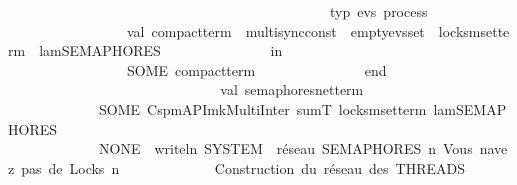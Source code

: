 \begin{isabellebody}
\ \ \ \ \ \ \ \ \ \ \ \ \ \ \ \ \ \ \ \ \ \ \ \ \ \ \ \ \ \ \ \ \ \ \ \ \ \ \ \ \ \ \ \ \ \ {\isacharat}{\kern0pt}{\isacharbraceleft}{\kern0pt}typ\ {\isachardoublequote}{\kern0pt}{\isacharparenleft}{\kern0pt}evs{\isacharparenright}{\kern0pt}\ process{\isachardoublequote}{\kern0pt}{\isacharbraceright}{\kern0pt}{\isacharparenright}{\kern0pt}\isanewline
\ \ \ \ \ \ \ \ \ \ \ \ \ \ \ \ \ val\ compact{\isacharunderscore}{\kern0pt}term\ {\isacharequal}{\kern0pt}\ multisync{\isacharunderscore}{\kern0pt}const\ {\isachardollar}{\kern0pt}\ empty{\isacharunderscore}{\kern0pt}evs{\isacharunderscore}{\kern0pt}set\ {\isachardollar}{\kern0pt}\ locks{\isacharunderscore}{\kern0pt}mset{\isacharunderscore}{\kern0pt}term\ {\isachardollar}{\kern0pt}\ lam{\isacharunderscore}{\kern0pt}SEMAPHORES\isanewline
\ \ \ \ \ \ \ \ \ \ \ \ \ \ \ in\isanewline
\ \ \ \ \ \ \ \ \ \ \ \ \ \ \ \ \ SOME\ compact{\isacharunderscore}{\kern0pt}term\isanewline
\ \ \ \ \ \ \ \ \ \ \ \ \ \ \ end{\isacharparenright}{\kern0pt}\isanewline
\ \ \ \ \ \ \ \ \ \ \ \ \isanewline
\isanewline
\ \ \ \ \ \ \ \ \ \isanewline
\ \ \ \ \ \ \ \ \ \ \isanewline
\ \ \ \ \ \ \ \ \ \ {\isacharparenleft}{\kern0pt}{\isacharasterisk}{\kern0pt}val\ semaphores{\isacharunderscore}{\kern0pt}net{\isacharunderscore}{\kern0pt}term\ {\isacharequal}{\kern0pt}\ \isanewline
\ \ \ \ \ \ \ \ \ \ \ \ \ SOME{\isacharparenleft}{\kern0pt}\ Cspm{\isacharunderscore}{\kern0pt}API{\isachardot}{\kern0pt}mk{\isacharunderscore}{\kern0pt}MultiInter{\isacharunderscore}{\kern0pt}\ sumT\ locks{\isacharunderscore}{\kern0pt}mset{\isacharunderscore}{\kern0pt}term\ lam{\isacharunderscore}{\kern0pt}SEMAPHORES\ {\isacharparenright}{\kern0pt}\ {\isacharasterisk}{\kern0pt}{\isacharparenright}{\kern0pt}\ \ \ \ \ \ \ \ \ \ \isanewline
\isanewline
\ \ \ \ \ \ \ \ \ \ \ \ \ {\isacharparenleft}{\kern0pt}{\isacharasterisk}{\kern0pt}{\isacharbar}{\kern0pt}NONE\ {\isacharequal}{\kern0pt}{\isachargreater}{\kern0pt}\ writeln\ {\isacharparenleft}{\kern0pt}{\isachardoublequote}{\kern0pt}{\isacharbrackleft}{\kern0pt}SYSTEM{\isacharbrackright}{\kern0pt}\ \ réseau\ SEMAPHORES\ {\isacharcolon}{\kern0pt}{\isacharbackslash}{\kern0pt}n\ Vous\ n{\isacharprime}{\kern0pt}avez\ pas\ de\ Locks\ {\isacharbackslash}{\kern0pt}n{\isachardoublequote}{\kern0pt}{\isacharparenright}{\kern0pt}\ {\isacharasterisk}{\kern0pt}{\isacharparenright}{\kern0pt}\isanewline
\isanewline
\ \ \ \ \ \ \ \ \ \ {\isacharparenleft}{\kern0pt}{\isacharasterisk}{\kern0pt}\ {}{\isachardot}{\kern0pt}\ Construction\ du\ réseau\ des\ THREADS\ {\isacharminus}{\kern0pt}{\isacharminus}{\kern0pt}{\isacharminus}{\kern0pt}{\isacharminus}{\kern0pt}{\isacharminus}{\kern0pt}{\isacharminus}{\kern0pt}{\isacharminus}{\kern0pt}{\isacharminus}{\kern0pt}{\isacharminus}{\kern0pt}{\isacharminus}{\kern0pt}{\isacharminus}{\kern0pt}{\isacharminus}{\kern0pt}{\isacharminus}{\kern0pt}{\isacharminus}{\kern0pt}{\isacharminus}{\kern0pt}{\isacharminus}{\kern0pt}{\isacharminus}{\kern0pt}{\isacharminus}{\kern0pt}{\isacharminus}{\kern0pt}{\isacharminus}{\kern0pt}{\isacharminus}{\kern0pt}{\isacharminus}{\kern0pt}{\isacharminus}{\kern0pt}{\isacharminus}{\kern0pt}{\isacharminus}{\kern0pt}{\isacharminus}{\kern0pt}{\isacharminus}{\kern0pt}\ {\isacharasterisk}{\kern0pt}{\isacharparenright}{\kern0pt}\isanewline

\end{isabellebody}
